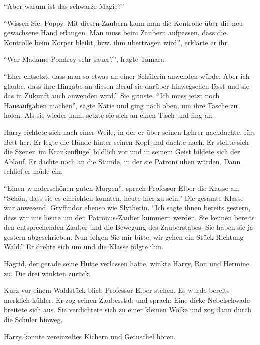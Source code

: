\begin{rueckblick}
\enquote{Aber warum ist das schwarze Magie?}

\enquote{Wissen Sie, Poppy. Mit diesen Zaubern kann man die Kontrolle über die neu gewachsene Hand erlangen. Man muss beim Zaubern aufpassen, dass die Kontrolle beim Körper bleibt, bzw. ihm übertragen wird}, erklärte er ihr.
\end{rueckblick}

\enquote{War Madame Pomfrey sehr sauer?}, fragte Tamara.

\enquote{Eher entsetzt, dass man so etwas an einer Schülerin anwenden würde. Aber ich glaube, dass ihre Hingabe an diesen Beruf sie darüber hinwegsehen lässt und sie das in Zukunft auch anwenden wird.} Sie grinste. \enquote{Ich muss jetzt noch Hausaufgaben machen}, sagte Katie und ging nach oben, um ihre Tasche zu holen. Als sie wieder kam, setzte sie sich an einen Tisch und fing an.

Harry richtete sich nach einer Weile, in der er über seinen Lehrer nachdachte, fürs Bett her. Er legte die Hände hinter seinen Kopf und dachte nach. Er stellte sich die Szenen im Krankenflügel bildlich vor und in seinem Geist bildete sich der Ablauf. Er dachte noch an die Stunde, in der sie Patroni üben würden.  Dann schlief er müde ein.

\trenn

\enquote{Einen wunderschönen guten Morgen}, sprach Professor Elber die Klasse an. \enquote{Schön, dass sie es einrichten konnten, heute hier zu sein.} Die gesamte Klasse war anwesend. Gryffindor ebenso wie Slytherin. \enquote{Ich sagte ihnen bereits gestern, dass wir uns heute um den Patronus-Zauber kümmern werden. Sie kennen bereits den entsprechenden Zauber und die Bewegung des Zauberstabes. Sie haben sie ja gestern abgeschrieben. Nun folgen Sie mir bitte, wir gehen ein Stück Richtung Wald.} Er drehte sich um und die Klasse folgte ihm.

Hagrid, der gerade seine Hütte verlassen hatte, winkte Harry, Ron und Hermine zu. Die drei winkten zurück.

Kurz vor einem Waldstück blieb Professor Elber stehen. Es wurde bereits merklich kühler. Er zog seinen Zauberstab und sprach:  Eine dicke Nebelschwade breitete sich aus. Sie verdichtete sich zu einer kleinen Wolke und zog dann durch die Schüler hinweg.

Harry konnte vereinzeltes Kichern und Getuschel hören.

